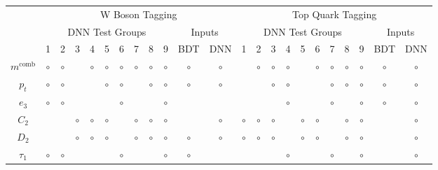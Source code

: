 \begin{table}[tp]
\centering
\tiny
\begin{tabular}{ c| c c c c c c c c c |c c|| c c c c c c c c c |c c| }    %
\hhline{~|-|-|-|-|-|-|-|-|-|-|-||-|-|-|-|-|-|-|-|-|-|-}
                                     & \multicolumn{11}{c||}{W Boson Tagging}                                                            & \multicolumn{11}{c|}{Top Quark Tagging}            \\ 
\hhline{~|-|-|-|-|-|-|-|-|-|-|-||-|-|-|-|-|-|-|-|-|-|-}
                                     & \multicolumn{9}{c|}{DNN Test Groups}                                                            & \multicolumn{2}{c||}{Inputs} & \multicolumn{9}{c|}{DNN Test Groups}                                                            & \multicolumn{2}{c|}{Inputs} \\
\hhline{|-||-|-|-|-|-|-|-|-|-|-|-||-|-|-|-|-|-|-|-|-|-|-}
\hhline{=::=:=:=:=:=:=:=:=:=:=:=::=:=:=:=:=:=:=:=:=:=:=}
\multicolumn{1}{|c||}{}    & 1   & 2   & 3   & 4   & 5   & 6   & 7   & 8   & 9   & BDT & DNN & 1   & 2   & 3   & 4   & 5   & 6   & 7   & 8   & 9   & BDT & DNN \\
\multicolumn{1}{|c||}{$m^{\mathrm{comb}}$}        & $\circ$ & $\circ$ &     & $\circ$ & $\circ$ & $\circ$ & $\circ$ & $\circ$ & $\circ$ & $\circ$ & $\circ$ &     & $\circ$ & $\circ$ & $\circ$ &     & $\circ$ & $\circ$ & $\circ$ & $\circ$ & $\circ$ & $\circ$   \\
\multicolumn{1}{|c||}{$p_t$}           & $\circ$ & $\circ$ &     &     & $\circ$ & $\circ$ &     & $\circ$ & $\circ$ & $\circ$ & $\circ$ &     &     & $\circ$ & $\circ$ &     &     & $\circ$ & $\circ$ & $\circ$ & $\circ$ & $\circ$   \\
\multicolumn{1}{|c||}{$e_3$}   & $\circ$ & $\circ$ &     &     &     & $\circ$ &     &     & $\circ$ &     &     &     &     &     & $\circ$ &     &     & $\circ$ &     & $\circ$ & $\circ$ & $\circ$   \\
\multicolumn{1}{|c||}{$C_2$}         &     &     & $\circ$ & $\circ$ & $\circ$ &     & $\circ$ & $\circ$ & $\circ$ &     & $\circ$ & $\circ$ & $\circ$ & $\circ$ &     & $\circ$ & $\circ$ &     & $\circ$ & $\circ$ &     & $\circ$   \\
\multicolumn{1}{|c||}{$D_2$}         &     &     & $\circ$ & $\circ$ & $\circ$ &     & $\circ$ & $\circ$ & $\circ$ & $\circ$ & $\circ$ & $\circ$ & $\circ$ & $\circ$ &     & $\circ$ & $\circ$ &     & $\circ$ & $\circ$ &     & $\circ$   \\
\multicolumn{1}{|c||}{$\tau_1$}       & $\circ$ & $\circ$ &     &     &     & $\circ$ &     &     & $\circ$ & $\circ$ &     &     &     &     & $\circ$ &     &     & $\circ$ &     & $\circ$ &     & $\circ$   \\

\end{tabular}
\end{table}
